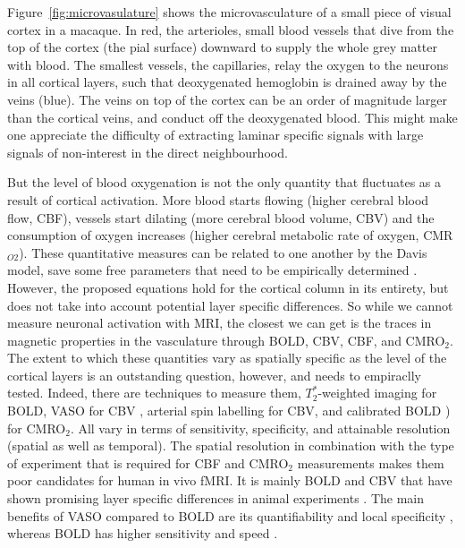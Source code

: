 Figure~\ref{fig:microvasulature} shows the microvasculature of a small piece of visual cortex in a macaque. In red, the arterioles, small blood vessels that dive from the top of the cortex (the pial surface) downward to supply the whole grey matter with blood. The smallest vessels, the capillaries, relay the oxygen to the neurons in all cortical layers, such that deoxygenated hemoglobin is drained away by the veins (blue). The veins on top of the cortex can be an order of magnitude larger than the cortical veins, and conduct off the deoxygenated blood. This might make one appreciate the difficulty of extracting laminar specific signals with large signals of non-interest in the direct neighbourhood. 


But the level of blood oxygenation is not the only quantity that fluctuates as a result of cortical activation. 
More blood starts flowing (higher cerebral blood flow, CBF), vessels start dilating (more cerebral blood volume, CBV) and the consumption of oxygen increases (higher cerebral metabolic rate of oxygen, CMR$_{O2}$). These quantitative measures can be related to one another by the Davis model, save some free parameters that need to be empirically determined \cite{Davis1997}. 
However, the proposed equations hold for the cortical column in its entirety, but does not take into account potential layer specific differences. So while we cannot measure neuronal activation with MRI, the closest we can get is the traces in magnetic properties in the vasculature through BOLD, CBV, CBF, and CMRO$_{2}$. The extent to which these quantities vary as spatially specific as the level of the cortical layers is an outstanding question, however, and needs to empiraclly tested. Indeed, there are techniques to measure them, $T_2^*$-weighted imaging \cite{Norris2006} for BOLD, VASO for CBV \cite{Huber2018}, arterial spin labelling \cite{Grade2015} for CBV, and calibrated BOLD \cite{Blockley2013}) for CMRO$_{2}$. All vary in terms of sensitivity, specificity, and attainable resolution (spatial as well as temporal). The spatial resolution in combination with the type of experiment that is required for CBF and CMRO$_2$ measurements makes them poor candidates for human in vivo fMRI. It is mainly BOLD and CBV that have shown promising layer specific differences in animal experiments \cite{Lu2004,Zhao2006,Jin2008,Goense2012}. The main benefits of VASO compared to BOLD are its quantifiability \cite{Lu2003} and local specificity \cite{Jin2006}, whereas BOLD has higher sensitivity and speed \cite{Huber2018}. %


